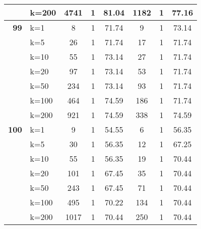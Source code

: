 \begin{table}[htbp]
\begin{tabular}{|l|l|c|c|c|c|c|c|}
     & k=200 & 4741 & 1 & 81.04 & 1182 & 1 & 77.16 \\ \hline
    \multicolumn{1}{|r|}{\textbf{99}} & k=1 & 8 & 1 & 71.74 & 9 & 1 & 73.14 \\ 
     & k=5 & 26 & 1 & 71.74 & 17 & 1 & 71.74 \\ 
     & k=10 & 55 & 1 & 73.14 & 27 & 1 & 71.74 \\ 
     & k=20 & 97 & 1 & 73.14 & 53 & 1 & 71.74 \\ 
     & k=50 & 234 & 1 & 73.14 & 93 & 1 & 71.74 \\ 
     & k=100 & 464 & 1 & 74.59 & 186 & 1 & 71.74 \\ 
     & k=200 & 921 & 1 & 74.59 & 338 & 1 & 74.59 \\ \hline
    \multicolumn{1}{|r|}{\textbf{100}} & k=1 & 9 & 1 & 54.55 & 6 & 1 & 56.35 \\ 
     & k=5 & 30 & 1 & 56.35 & 12 & 1 & 67.25 \\ 
     & k=10 & 55 & 1 & 56.35 & 19 & 1 & 70.44 \\ 
     & k=20 & 101 & 1 & 67.45 & 35 & 1 & 70.44 \\ 
     & k=50 & 243 & 1 & 67.45 & 71 & 1 & 70.44 \\ 
     & k=100 & 495 & 1 & 70.22 & 134 & 1 & 70.44 \\ 
     & k=200 & 1017 & 1 & 70.44 & 250 & 1 & 70.44 \\ \hline
    \end{tabular}
\end{table}